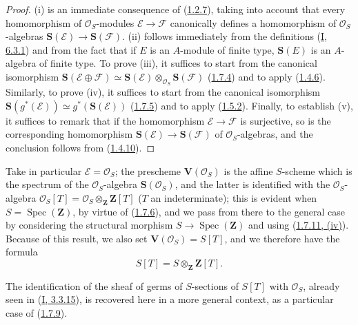 \begin{proof}
(i) is an immediate consequence of
(\hyperref[II.1.2.7]{1.2.7}), taking into account that every
homomorphism of $\mathcal{O}_S$-modules $\mathcal{E}\to\mathcal{F}$
canonically defines a homomorphism of $\mathcal{O}_S$-algebras
$\mathbf{S}(\mathcal{E})\to\mathbf{S}(\mathcal{F})$. (ii) follows
immediately from the definitions (\hyperref[I.6.3.1]{I, 6.3.1}) and
from the fact that if $E$ is an $A$-module of finite type, $\mathbf{S}(E)$
is an $A$-algebra of finite type. To prove (iii), it suffices to start
from the canonical isomorphism
$\mathbf{S}(\mathcal{E}\oplus\mathcal{F})
\simeq\mathbf{S}(\mathcal{E})
\otimes_{\mathcal{O}_S}\mathbf{S}(\mathcal{F})$
(\hyperref[II.1.7.4]{1.7.4}) and to apply
(\hyperref[II.1.4.6]{1.4.6}). Similarly, to prove (iv), it suffices to
start from the canonical isomorphism
$\mathbf{S}(g^*(\mathcal{E}))
\simeq g^*(\mathbf{S}(\mathcal{E}))$
(\hyperref[II.1.7.5]{1.7.5}) and to apply
(\hyperref[II.1.5.2]{1.5.2}). Finally, to establish (v), it suffices to
remark that if the homomorphism $\mathcal{E}\to\mathcal{F}$ is surjective,
so is the corresponding homomorphism
$\mathbf{S}(\mathcal{E})\to\mathbf{S}(\mathcal{F})$ of
$\mathcal{O}_S$-algebras, and the conclusion follows from
(\hyperref[II.1.4.10]{1.4.10}).
\end{proof}

\begin{env}[1.7.12]
\label{II.1.7.12}
Take in particular $\mathcal{E}=\mathcal{O}_S$; the prescheme
$\mathbf{V}(\mathcal{O}_S)$ is the affine $S$-scheme which is the spectrum
of the $\mathcal{O}_S$-algebra $\mathbf{S}(\mathcal{O}_S)$, and the latter
is identified with the $\mathcal{O}_S$-algebra
$\mathcal{O}_S[T]=\mathcal{O}_S\otimes_{\mathbf{Z}}\mathbf{Z}[T]$
($T$ an indeterminate); this is evident when
$S=\operatorname{Spec}(\mathbf{Z})$, by virtue of
(\hyperref[II.1.7.6]{1.7.6}), and we pass from there to the general case
by considering the structural morphism
$S\to\operatorname{Spec}(\mathbf{Z})$ and using
(\hyperref[II.1.7.11]{1.7.11, (iv)}). Because of this result, we also
set $\mathbf{V}(\mathcal{O}_S)=S[T]$, and we therefore have the formula
\[
  S[T]=S\otimes_{\mathbf{Z}}\mathbf{Z}[T].
  \tag{1.7.12.1}\label{II.1.7.12.1}
\]

The identification of the sheaf of germs of $S$-sections of $S[T]$ with
$\mathcal{O}_S$, already seen in
(\hyperref[I.3.3.15]{I, 3.3.15}), is recovered here in a more
general context, as a particular case of (\hyperref[II.1.7.9]{1.7.9}).
\end{env}

